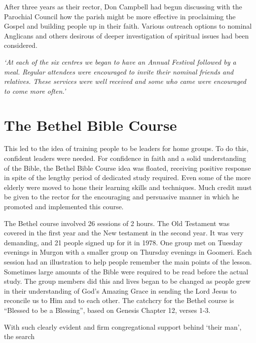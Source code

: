 After three years as their rector, Don Campbell had begun discussing with the Parochial Council how the parish might be more effective in proclaiming the Gospel and building people up in their faith. Various outreach options to nominal Anglicans and others desirous of deeper investigation of spiritual issues had been considered.



\emph{`At each of the six centres we began to have an Annual Festival followed by a meal. Regular attendees were encouraged to invite their nominal friends and relatives. These services were well received and some who came were encouraged to come more often.'}



\section{The Bethel Bible Course}



This led to the idea of training people to be leaders for home groups. To do this, confident leaders were needed. For confidence in faith and a solid understanding of the Bible, the Bethel Bible Course idea was floated, receiving positive response in spite of the lengthy period of dedicated study required. Even some of the more elderly were moved to hone their learning skills and techniques. Much credit must be given to the rector for the encouraging and persuasive manner in which he promoted and implemented this course.



The Bethel course involved 26 sessions of 2  hours. The Old Testament was covered in the first year and the New testament in the second year. It was very demanding, and 21 people signed up for it in 1978. One group met on Tuesday evenings in Murgon with a smaller group on Thursday evenings in Goomeri. Each session had an illustration to help people remember the main points of the lesson. Sometimes large amounts of the Bible were required to be read before the actual study. The group members did this and lives began to be changed as people grew in their understanding of God's Amazing Grace in sending the Lord Jesus to reconcile us to Him and to each other. The catchcry for the Bethel course is ``Blessed to be a Blessing'', based on Genesis Chapter 12, verses 1-3.



With such clearly evident and firm congregational support behind `their man', the search



